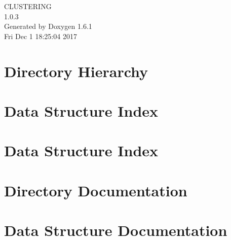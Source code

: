 \documentclass[a4paper]{book}
\begin{document}
\begin{titlepage}
\vspace*{7cm}
\begin{center}
{\Large CLUSTERING \\[1ex]\large 1.0.3 }\\
\vspace*{1cm}
{\large Generated by Doxygen 1.6.1}\\
\vspace*{0.5cm}
{\small Fri Dec 1 18:25:04 2017}\\
\end{center}
\end{titlepage}
\clearemptydoublepage
{}
\tableofcontents
\clearemptydoublepage
{}
\chapter{Directory Hierarchy}

\chapter{Data Structure Index}

\chapter{Data Structure Index}

\chapter{Directory Documentation}




\chapter{Data Structure Documentation}
































\printindex
\end{document}
